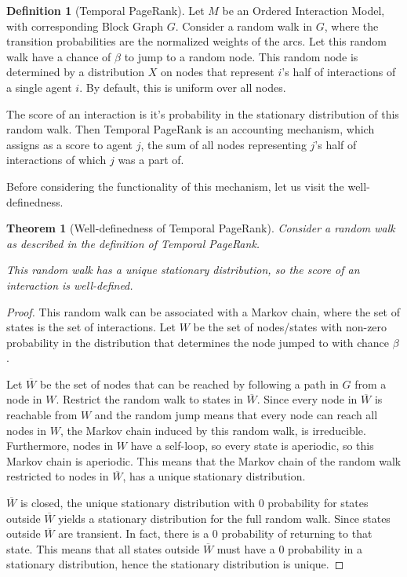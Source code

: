 \documentclass[a4paper,11pt]{book}
\newcommand{\ov}{\overline}
\newtheorem{theorem}{Theorem}
\theoremstyle{definition}
\newtheorem{definition}{Definition}
\begin{document}
\begin{definition}[Temporal PageRank]
    Let $M$ be an Ordered Interaction Model, with corresponding Block Graph $G$.
    Consider a random walk in $G$, where the transition probabilities are the normalized
    weights of the arcs. Let this random walk have a chance of $\beta$ to jump to a random node.
    This random node is determined by a distribution $X$ on nodes that represent $i$'s half of interactions of
    a single agent $i$. By default, this is uniform over all nodes.

    The score of an interaction is it's probability in the stationary distribution of this random walk.
    Then Temporal PageRank is an accounting mechanism, which assigns as a score to agent $j$, the
    sum of all nodes representing $j$'s half of interactions of which $j$ was a part of.
\end{definition}


Before considering the functionality of this mechanism, let us visit the well-definedness.

\begin{theorem}[Well-definedness of Temporal PageRank]
    Consider a random walk as described in the definition of Temporal PageRank.

    This random walk has a unique stationary distribution, so the score of an interaction is well-defined.
    \label{thm:well_defined}
\end{theorem}
\begin{proof}
    This random walk can be associated with a Markov chain, where the set of states is the set of
    interactions. Let $W$ be the set of nodes/states with non-zero probability in the distribution
    that determines the node jumped to with chance $\beta$.

    Let $\ov{W}$ be the set of nodes that can be reached by following a path in $G$ from a node
    in $W$. Restrict the random walk to states in $\ov{W}$. Since every node in $\ov{W}$ is reachable
    from $W$ and the random jump means that every node can reach all nodes in $W$, the Markov chain
    induced by this random walk, is irreducible. Furthermore, nodes in $W$ have a self-loop, so every
    state is aperiodic, so this Markov chain is aperiodic. This means that the Markov chain of the
    random walk restricted to nodes in $\ov{W}$, has a unique stationary distribution.

    $\ov{W}$ is closed, the unique stationary distribution with $0$ probability for states outside
    $\ov{W}$ yields a stationary distribution for the full random walk. Since states
    outside $\ov{W}$ are transient. In fact, there is a $0$ probability of returning to that
    state. This means that all states outside $\ov{W}$ must have a $0$ probability in a stationary
    distribution, hence the stationary distribution is unique.
\end{proof}
\end{document}

